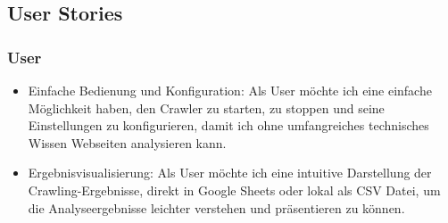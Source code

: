 \documentclass[Bachelor,BIF,german,IEEE]{BASE/twbook}
\begin{document}
\subsection{User Stories}

\subsubsection{User}
\begin{itemize}
    \item Einfache Bedienung und Konfiguration: Als User möchte ich eine einfache Möglichkeit haben, den Crawler zu starten, zu stoppen und seine Einstellungen zu konfigurieren, damit ich ohne umfangreiches technisches Wissen Webseiten analysieren kann.
    \item Ergebnisvisualisierung: Als User möchte ich eine intuitive Darstellung der Crawling-Ergebnisse, direkt in Google Sheets oder lokal als CSV Datei, um die Analyseergebnisse leichter verstehen und präsentieren zu können.
\end{itemize}
\end{document}

